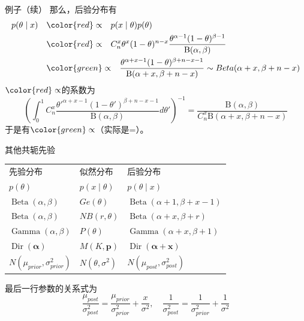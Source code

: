 \begin{frame}

\begin{block}{例子（续）}
那么，后验分布有
\begin{align*}
p(\theta \mid x) \quad & {\color{red}\propto} \quad p(x \mid \theta) p(\theta) \\
& {\color{red}\propto} \quad C_n^x \theta^x (1-\theta)^{n-x} \dfrac{\theta^{\alpha-1} (1-\theta)^{\beta-1}}{\mathrm{B}(\alpha,\beta)} \\
& {\color{green}\propto} \quad \dfrac{\theta^{\alpha+x-1} (1-\theta)^{\beta+n-x-1}}{\mathrm{B}(\alpha+x,\beta+n-x)} \sim Beta(\alpha+x,\beta+n-x)
\end{align*}
${\color{red}\propto}$的系数为
\[\left( \int_0^1 C_n^x \dfrac{\theta'^{\alpha+x-1} (1-\theta')^{\beta+n-x-1}}{\mathrm{B}(\alpha,\beta)} d\theta' \right)^{-1} = \dfrac{\mathrm{B}(\alpha,\beta)}{C_n^x \mathrm{B}(\alpha+x,\beta+n-x)}\]
于是有${\color{green}\propto}$（实际是=）。
\end{block}

\end{frame}


\begin{frame}

\begin{block}{其他共轭先验}
\begin{center}
\renewcommand{\arraystretch}{1.3}
\begin{tabu} to 1\textwidth { | X[1.2,c] | X[0.8,c] | X[2,c] | }
\hline
先验分布 & 似然分布 & 后验分布 \\
$p(\theta)$ & $p(x \mid \theta)$ & $p(\theta \mid x)$ \\
\hline
$\operatorname{Beta}(\alpha,\beta)$ & $Ge(\theta)$ & $\operatorname{Beta}(\alpha+1,\beta+x-1)$ \\
\hline
$\operatorname{Beta}(\alpha,\beta)$ & $NB(r,\theta)$ & $\operatorname{Beta}(\alpha+x,\beta+r)$ \\
\hline
$\operatorname{Gamma}(\alpha,\beta)$ & $P(\theta)$ & $\operatorname{Gamma}(\alpha+x,\beta+1)$ \\
\hline
$\operatorname{Dir}(\boldsymbol\alpha)$ & $M(K,\mathbf{p})$ & $\operatorname{Dir}(\boldsymbol\alpha + \mathbf{x})$ \\
\hline
$N(\mu_{prior},\sigma^2_{prior})$ & $N(\theta,\sigma^2)$ & $N(\mu_{post},\sigma^2_{post})$ \\
\hline
\end{tabu}
\renewcommand{\arraystretch}{1}
\end{center}
最后一行参数的关系式为
\[\dfrac{\mu_{post}}{\sigma^2_{post}} = \dfrac{\mu_{prior}}{\sigma^2_{prior}} + \dfrac{x}{\sigma^2}, \quad \dfrac{1}{\sigma^2_{post}} = \dfrac{1}{\sigma^2_{prior}} + \dfrac{1}{\sigma^2}\]
\end{block}

\end{frame}

